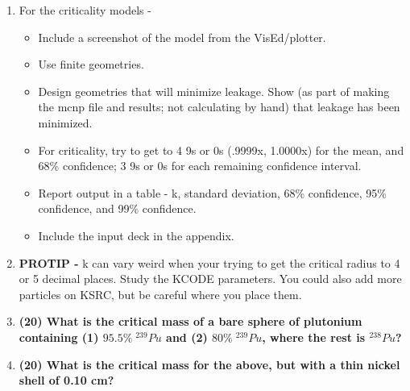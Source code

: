 \documentclass[11pt,a4paper]{article}
\begin{document}
\begin{enumerate}[leftmargin=*,topsep=0pt,font=\bfseries]
        \newpage 
    \item[] For the criticality models - 
        \begin{itemize}[leftmargin=*,topsep=0pt]
            \item Include a screenshot of the model from the VisEd/plotter.
            \item Use finite geometries.
            \item Design geometries that will minimize leakage. Show (as part of making the mcnp file and results; not calculating by hand) that leakage has been minimized.
            \item For criticality, try to get to 4 9s or 0s (.9999x, 1.0000x) for the mean, and 68\% confidence; 3 9s or 0s for each remaining confidence interval.
            \item Report output in a table - k, standard deviation, 68\% confidence, 95\% confidence, and 99\% confidence.
            \item Include the input deck in the appendix.
        \end{itemize}
    \item[]\textbf{PROTIP - }k can vary weird when your trying to get the critical radius to 4 or 5 decimal places. Study the KCODE parameters. You could also add more particles on KSRC, but be careful where you place them.
        \newpage
    \item\textbf{(20) What is the critical mass of a bare sphere of plutonium containing (1) $95.5\% \; ^{239}Pu$ and (2) $80\% \; ^{239}Pu$, where the rest is $^{238}Pu$?}
        \vspace{0.25in}\\




















        \newpage 
    \item\textbf{(20) What is the critical mass for the above, but with a thin nickel shell of 0.10 cm?}
        \vspace{0.25in}\\

















\end{enumerate}
\end{document}
